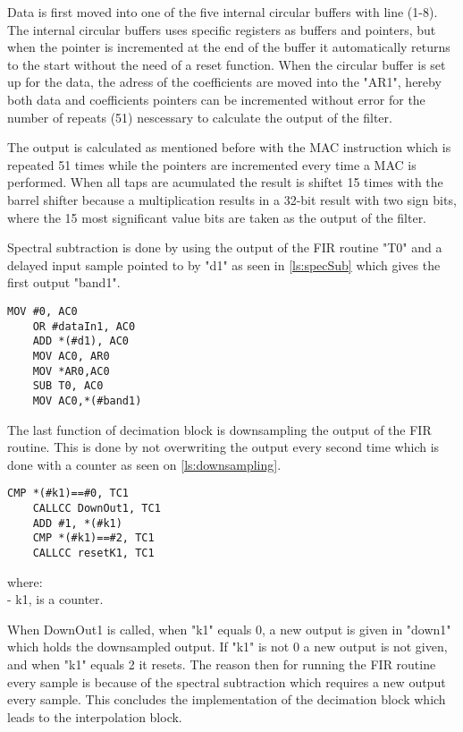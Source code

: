 Data is first moved into one of the five internal circular buffers with line (1-8). The internal circular buffers uses specific registers as buffers and pointers, but when the pointer is incremented at the end of the buffer it automatically returns to the start without the need of a reset function. When the circular buffer is set up for the data, the adress of the coefficients are moved into the "AR1", hereby both data and coefficients pointers can be incremented without error for the number of repeats (51) nescessary to calculate the output of the filter. 

The output is calculated as mentioned before with the MAC instruction which is repeated 51 times while the pointers are incremented every time a MAC is performed. When all taps are acumulated the result is shiftet 15 times with the barrel shifter because a multiplication results in a 32-bit result with two sign bits, where the 15 most significant value bits are taken as the output of the filter.

Spectral subtraction is done by using the output of the FIR routine "T0" and a delayed input sample pointed to by "d1" as seen in \autoref{ls:specSub} which gives the first output "band1".

\begin{lstlisting}[language={[x86masm]Assembler}, caption = {Spectral subtraction.},label={ls:specSub}]
	MOV #0, AC0
	OR #dataIn1, AC0			
	ADD *(#d1), AC0				
	MOV AC0, AR0
	MOV *AR0,AC0
	SUB T0, AC0
	MOV AC0,*(#band1)
\end{lstlisting}

The last function of decimation block is downsampling the output of the FIR routine. This is done by not overwriting the output every second time which is done with a counter as seen on \autoref{ls:downsampling}.

\begin{lstlisting}[language={[x86masm]Assembler}, caption = {Downsampling.},label={ls:downsampling}]
	CMP *(#k1)==#0, TC1
	CALLCC DownOut1, TC1
	ADD #1, *(#k1)
	CMP *(#k1)==#2, TC1
	CALLCC resetK1, TC1
\end{lstlisting}
where: \\
- k1, is a counter.

When DownOut1 is called, when "k1" equals 0, a new output is given in "down1" which holds the downsampled output. If "k1" is not 0 a new output is not given, and when "k1" equals 2 it resets. The reason then for running the FIR routine every sample is because of the spectral subtraction which requires a new output every sample. This concludes the implementation of the decimation block which leads to the interpolation block.

